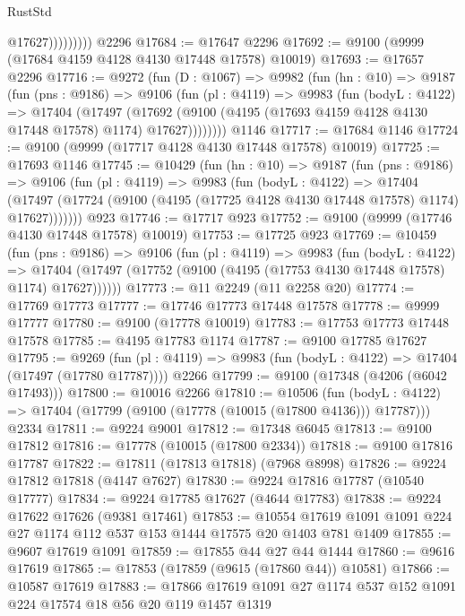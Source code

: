 \begin{lexlean}{RustStd}
\begin{coremodule}
                      @17627)))))))))
    @2296
@17684 := @17647 @2296
@17692 := @9100 (@9999 (@17684 @4159 @4128 @4130 @17448 @17578) @10019)
@17693 := @17657 @2296
@17716 := @9272
    (fun (D : @1067) =>
    @9982
      (fun (hn : @10) =>
      @9187
        (fun (pns : @9186) =>
        @9106
          (fun (pl : @4119) =>
          @9983
            (fun (bodyL : @4122) =>
            @17404
              (@17497
                (@17692 (@9100 (@4195 (@17693 @4159 @4128 @4130 @17448 @17578) @1174) @17627))))))))
    @1146
@17717 := @17684 @1146
@17724 := @9100 (@9999 (@17717 @4128 @4130 @17448 @17578) @10019)
@17725 := @17693 @1146
@17745 := @10429
    (fun (hn : @10) =>
    @9187
      (fun (pns : @9186) =>
      @9106
        (fun (pl : @4119) =>
        @9983
          (fun (bodyL : @4122) =>
          @17404
            (@17497 (@17724 (@9100 (@4195 (@17725 @4128 @4130 @17448 @17578) @1174) @17627)))))))
    @923
@17746 := @17717 @923
@17752 := @9100 (@9999 (@17746 @4130 @17448 @17578) @10019)
@17753 := @17725 @923
@17769 := @10459
    (fun (pns : @9186) =>
    @9106
      (fun (pl : @4119) =>
      @9983
        (fun (bodyL : @4122) =>
        @17404 (@17497 (@17752 (@9100 (@4195 (@17753 @4130 @17448 @17578) @1174) @17627))))))
@17773 := @11 @2249 (@11 @2258 @20)
@17774 := @17769 @17773
@17777 := @17746 @17773 @17448 @17578
@17778 := @9999 @17777
@17780 := @9100 (@17778 @10019)
@17783 := @17753 @17773 @17448 @17578
@17785 := @4195 @17783 @1174
@17787 := @9100 @17785 @17627
@17795 := @9269
    (fun (pl : @4119) => @9983 (fun (bodyL : @4122) => @17404 (@17497 (@17780 @17787))))
    @2266
@17799 := @9100 (@17348 (@4206 (@6042 @17493)))
@17800 := @10016 @2266
@17810 := @10506
    (fun (bodyL : @4122) => @17404 (@17799 (@9100 (@17778 (@10015 (@17800 @4136))) @17787)))
    @2334
@17811 := @9224 @9001
@17812 := @17348 @6045
@17813 := @9100 @17812
@17816 := @17778 (@10015 (@17800 @2334))
@17818 := @9100 @17816 @17787
@17822 := @17811 (@17813 @17818) (@7968 @8998)
@17826 := @9224 @17812 @17818 (@4147 @7627)
@17830 := @9224 @17816 @17787 (@10540 @17777)
@17834 := @9224 @17785 @17627 (@4644 @17783)
@17838 := @9224 @17622 @17626 (@9381 @17461)
@17853 := @10554 @17619 @1091 @1091 @224 @27 @1174 @112 @537 @153 @1444 @17575 @20 @1403 @781 @1409
@17855 := @9607 @17619 @1091
@17859 := @17855 @44 @27 @44 @1444
@17860 := @9616 @17619
@17865 := @17853 (@17859 (@9615 (@17860 @44)) @10581)
@17866 := @10587 @17619
@17883 := @17866
    @17619
    @1091
    @27
    @1174
    @537
    @152
    @1091
    @224
    @17574
    @18
    @56
    @20
    @119
    @1457
    @1319

\end{coremodule}
\end{lexlean}
